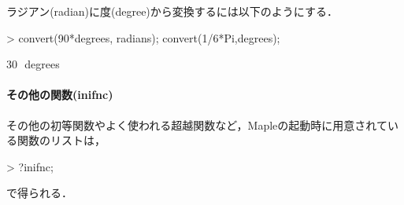 ラジアン(radian)に度(degree)から変換するには以下のようにする．
\begin{MapleInput}
> convert(90*degrees, radians);
  convert(1/6*Pi,degrees);
\end{MapleInput}
\begin{MapleOutput}
\pi
\end{MapleOutput}
\begin{MapleOutput}
30\,\, degrees
\end{MapleOutput}
\paragraph{その他の関数(inifnc)}
その他の初等関数やよく使われる超越関数など，Mapleの起動時に用意されている関数のリストは，
\begin{MapleInput}
> ?inifnc;
\end{MapleInput}
で得られる．
